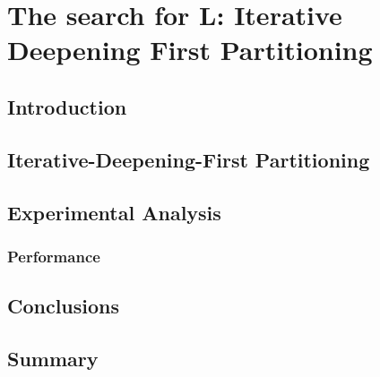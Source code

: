 \chapter{The search for L: Iterative Deepening First Partitioning}
\label{idfp}

\section{Introduction}

\section{Iterative-Deepening-First Partitioning}

\section{Experimental Analysis}

\subsection{Performance}

\section{Conclusions}

\section{Summary}

